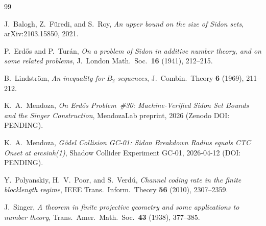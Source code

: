 \documentclass[11pt]{amsart}
\theoremstyle{plain}
\theoremstyle{definition}
\theoremstyle{remark}
\begin{document}
\begin{thebibliography}{99}

J.\ Balogh, Z.\ F\"uredi, and S.\ Roy,
\emph{An upper bound on the size of Sidon sets},
arXiv:2103.15850, 2021.

P.\ Erd\H{o}s and P.\ Tur\'an,
\emph{On a problem of Sidon in additive number theory, and on some
  related problems},
J.\ London Math.\ Soc.\ \textbf{16} (1941), 212--215.

B.\ Lindstr\"om,
\emph{An inequality for $B_2$-sequences},
J.\ Combin.\ Theory \textbf{6} (1969), 211--212.

K.\ A.\ Mendoza,
\emph{On Erd\H{o}s Problem~\#30: Machine-Verified Sidon Set Bounds
  and the Singer Construction},
MendozaLab preprint, 2026 (Zenodo DOI: PENDING).

K.\ A.\ Mendoza,
\emph{Gödel Collision GC-01: Sidon Breakdown Radius equals
  CTC Onset at arcsinh(1)},
Shadow Collider Experiment GC-01, 2026-04-12 (DOI: PENDING).

Y.\ Polyanskiy, H.\ V.\ Poor, and S.\ Verd\'u,
\emph{Channel coding rate in the finite blocklength regime},
IEEE Trans.\ Inform.\ Theory \textbf{56} (2010), 2307--2359.

J.\ Singer,
\emph{A theorem in finite projective geometry and some applications
  to number theory},
Trans.\ Amer.\ Math.\ Soc.\ \textbf{43} (1938), 377--385.

\end{thebibliography}
\end{document}
